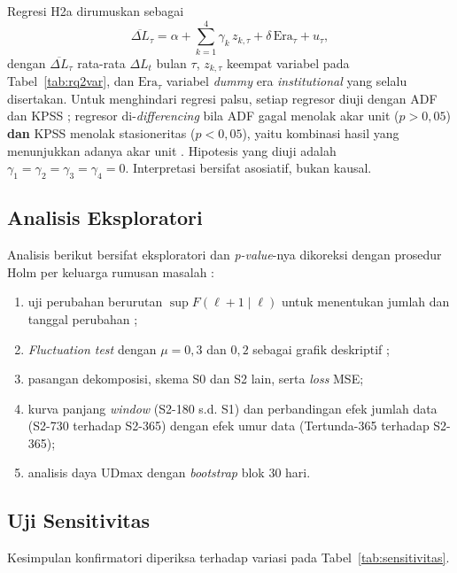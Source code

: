 Regresi H2a dirumuskan sebagai
\begin{equation}
  \overline{\Delta L}_\tau = \alpha + \sum_{k=1}^{4} \gamma_k\, z_{k,\tau}
    + \delta\, \text{Era}_\tau + u_\tau,
  \label{eq:rq2}
\end{equation}
dengan $\overline{\Delta L}_\tau$ rata-rata $\Delta L_t$ bulan $\tau$,
$z_{k,\tau}$ keempat variabel pada Tabel~\ref{tab:rq2var}, dan
$\text{Era}_\tau$ variabel \textit{dummy} era \textit{institutional} yang
selalu disertakan. Untuk menghindari regresi palsu, setiap regresor diuji
dengan ADF \cite{dickey1979} dan KPSS \cite{kwiatkowski1992}; regresor
di-\textit{differencing} bila ADF gagal menolak akar unit ($p > 0{,}05$)
\textbf{dan} KPSS menolak stasioneritas ($p < 0{,}05$), yaitu kombinasi hasil
yang menunjukkan adanya akar unit \cite{kwiatkowski1992}. Hipotesis yang diuji
adalah $\gamma_1 = \gamma_2 = \gamma_3 = \gamma_4 = 0$. Interpretasi bersifat
asosiatif, bukan kausal.

\subsection{Analisis Eksploratori}
Analisis berikut bersifat eksploratori dan \textit{p-value}-nya dikoreksi
dengan prosedur Holm per keluarga rumusan masalah \cite{holm1979}:
\begin{enumerate}
  \item uji perubahan berurutan $\sup F(\ell+1 \mid \ell)$ untuk menentukan
        jumlah dan tanggal perubahan \cite{bai2003};
  \item \textit{Fluctuation test} dengan $\mu = 0{,}3$ dan $0{,}2$ sebagai
        grafik deskriptif \cite{giacomini2010};
  \item pasangan dekomposisi, skema S0 dan S2 lain, serta \textit{loss} MSE;
  \item kurva panjang \textit{window} (S2-180 s.d. S1) dan perbandingan efek
        jumlah data (S2-730 terhadap S2-365) dengan efek umur data
        (Tertunda-365 terhadap S2-365);
  \item analisis daya UDmax dengan \textit{bootstrap} blok 30 hari.
\end{enumerate}

\subsection{Uji Sensitivitas}
Kesimpulan konfirmatori diperiksa terhadap variasi pada
Tabel~\ref{tab:sensitivitas}.

